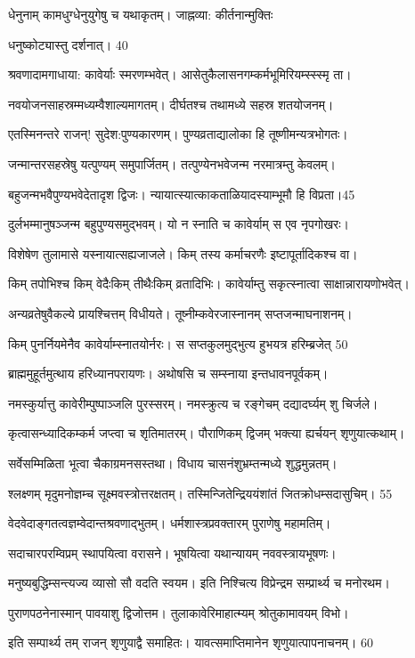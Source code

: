 धेनुनाम् कामधुग्धेनुयुगेषु च यथाकृतम्।
जाह्नव्या: कीर्तनान्मुक्तिः

धनुष्कोट्यास्तु दर्शनात्। 40

श्रवणादामगाधाया: कावेर्याः स्मरणम्भवेत्।
आसेतुकैलासनगम्कर्मभूमिरियम्स्स्स्मृ ता।

नवयोजनसाहस्रम्मध्यम्वैशाल्यमागतम्।
दीर्घतश्च तथामध्ये सहस्र शतयोजनम्।

एतस्मिनन्तरे राजन्! सुदेश:पुण्यकारणम्।
पुण्यव्रताद्यालोका हि तूष्णीमन्यत्रभोगतः।

जन्मान्तरसहस्रेषु यत्पुण्यम् समुपार्जितम्।
तत्पुण्येनभवेजन्म नरमात्रम्तु केवलम्।

बहुजन्मभवैपुण्यभवेदेतादृश द्विजः।
न्यायात्स्यात्काकताळियादस्याम्भूमौ हि विप्रता।45

दुर्लभम्मानुषञ्जन्म बहुपुण्यसमुद्भवम्।
यो न स्नाति च कावेर्याम् स एव नृपगोखरः।

विशेषेण तुलामासे यस्नायात्सह्यजाजले।
किम् तस्य कर्माचरणैः इष्टापूर्तादिकश्च वा।

किम् तपोभिश्च किम् वेदैःकिम् तीथैःकिम् व्रतादिभिः।
कावेर्याम्तु सकृत्स्नात्वा साक्षान्नारायणोभवेत्।

अन्यव्रतेषुवैकल्ये प्रायश्चित्तम् विधीयते।
तूष्नीम्कवेरजास्नानम् सप्तजन्माघनाशनम्।

किम् पुनर्नियमेनैव कावेर्याम्स्नातयोर्नरः।
स सप्तकुलमुद्भुत्य हुभयत्र हरिम्ब्रजेत् 50

ब्राह्ममुहूर्तमुत्थाय हरिध्यानपरायणः।
अथोषसि च सम्स्नाया इन्तधावनपूर्वकम्।

नमस्कुर्यात्तु कावेरीम्पुष्पाञ्जलि पुरस्सरम्।
नमस्क्रुत्य च रङ्गेचम् दद्यादर्घ्यम् शु चिर्जले।

कृत्वासन्ध्यादिकम्कर्म जप्त्वा च शृतिमातरम्।
पौराणिकम् द्विजम् भक्त्या ह्यर्चयन् शृणुयात्कथाम्।

सर्वेसम्मिळिता भूत्वा चैकाग्रमनसस्तथा।
विधाय चासनंशुभ्रम्तन्मध्ये शुद्धमुन्नतम्।

श्लक्ष्णम् मृदुमनोज्ञम्च सूक्ष्मवस्त्रोत्तरक्षतम्।
तस्मिन्जितेन्द्रिययंशांतं जितक्रोधम्सदासुचिम्। 55

वेदवेदाङ्गतत्वज्ञम्वेदान्तश्रवणाद्भुतम्।
धर्मशास्त्रप्रवक्तारम् पुराणेषु महामतिम्।

सदाचारपरम्विप्रम् स्थापयित्वा वरासने।
भूषयित्वा यथान्यायम् नववस्त्रायभूषणः।

मनुष्यबुद्धिम्सन्त्यज्य व्यासो सौ वदति स्वयम।
इति निश्चित्य विप्रेन्द्रम सम्प्रार्थ्य च मनोरथम।

पुराणपठनेनास्मान् पावयाशु द्विजोत्तम।
तुलाकावेरिमाहात्म्यम् श्रोतुकामावयम् विभो।

इति सम्पार्थ्य तम् राजन् शृणुयाद्वै समाहितः।
यावत्समाप्तिमानेन शृणुयात्पापनाचनम्। 60

